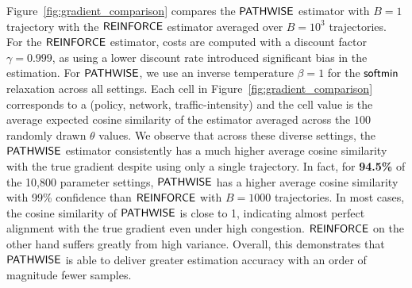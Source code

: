 Figure~\ref{fig:gradient_comparison} compares the $\mathsf{PATHWISE}$ estimator with $B = 1$ trajectory with the $\mathsf{REINFORCE}$ estimator averaged over $B = 10^3$ trajectories. For the $\mathsf{REINFORCE}$ estimator, costs are computed with a discount factor $\gamma = 0.999$, as using a lower discount rate introduced significant bias in the estimation. For $\mathsf{PATHWISE}$, we use an inverse temperature $\beta = 1$ for the $\mathsf{softmin}$ relaxation across all settings. 
Each cell in Figure~\ref{fig:gradient_comparison} corresponds to a (policy, network, traffic-intensity) and the cell value is the average expected cosine similarity of the estimator averaged across the $100$ randomly drawn $\theta$ values. We observe that across these diverse settings, the $\mathsf{PATHWISE}$ estimator consistently has a much higher average cosine similarity with the true gradient despite using only a single trajectory. In fact, for {\bf 94.5\%} of the 10,800 parameter settings, $\mathsf{PATHWISE}$ has a higher average cosine similarity with 99\% confidence than $\mathsf{REINFORCE}$ with $B = 1000$ trajectories. In most cases, the cosine similarity of $\mathsf{PATHWISE}$ is close to 1, indicating almost perfect alignment with the true gradient even under high congestion. $\mathsf{REINFORCE}$ on the other hand suffers greatly from high variance. 
Overall, this demonstrates that $\mathsf{PATHWISE}$ is able to deliver greater estimation accuracy with an order of magnitude fewer samples.


    
